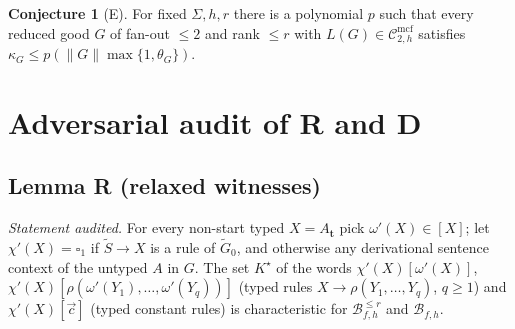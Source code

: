 \documentclass[11pt]{article}
\theoremstyle{definition}
\newtheorem{conjecture}[theorem]{Conjecture}
\theoremstyle{remark}
\newcommand{\Cmcf}[2]{\mathcal{C}^{\mathrm{mcf}}_{#1,#2}}
\newcommand{\tuple}[1]{\vec{#1}}
\newcommand{\blank}{\square}
\newcommand{\B}{\mathcal B}
\begin{document}
\begin{conjecture}[E]\label{conj:E}
For fixed $\Sigma,h,r$ there is a polynomial $p$ such that every reduced
good $G$ of fan-out $\le2$ and rank $\le r$ with $L(G)\in\Cmcf{2}{h}$
satisfies $\kappa_G\le p(\|G\|\max\{1,\theta_G\})$.
\end{conjecture}

\section{Adversarial audit of R and D}

\subsection{Lemma R (relaxed witnesses)}
\emph{Statement audited.}  For every non-start typed $X=A_{\mathbf t}$ pick
$\omega'(X)\in[X]$; let $\chi'(X)=\blank_1$ if $\widetilde S\to X$ is a rule
of $\widetilde G_0$, and otherwise any derivational sentence context of the
untyped $A$ in $G$.  The set $K^\star$ of the words
$\chi'(X)[\omega'(X)]$,
$\chi'(X)[\rho(\omega'(Y_1),\ldots,\omega'(Y_q))]$ (typed rules
$X\to\rho(Y_1,\ldots,Y_q)$, $q\ge1$) and $\chi'(X)[\tuple c]$ (typed
constant rules) is characteristic for $\B^{\le r}_{f,h}$ and $\B_{f,h}$.
\end{document}
